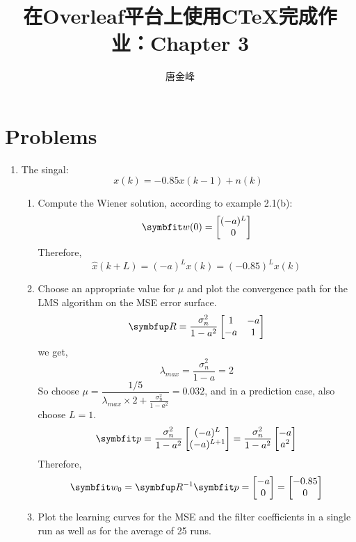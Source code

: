 \documentclass[11pt]{article}
\title{在Overleaf平台上使用C\TeX 完成作业：Chapter 3}
\author{唐金峰}
\begin{document}
\maketitle
\section*{Problems}
\begin{enumerate}[itemindent= 0pt]
    \item  The singal:
        $$x(k)=-0.85x(k-1)+n(k)$$
        \begin{enumerate}[itemindent= -5pt]
            \item Compute the Wiener solution, according to example 2.1(b):
            $$
            \Vector{w}(0)=
            \begin{bmatrix}
            (-a)^L \\ 0
            \end{bmatrix}
            $$
            Therefore,
            $$
            \hat{x}(k+L)=(-a)^{L} x(k) =(-0.85)^{L} x(k)
            $$
            \item Choose an appropriate value for $\mu$ and plot the convergence path for the LMS algorithm on the MSE error surface.
            $$
            \Matrix{R} = \frac{\sigma_n^2}{1-a^2}
            \begin{bmatrix}
            1 & -a \\
            -a & 1
            \end{bmatrix}
            $$
            we get,
            $$
            \lambda_{max} = \frac{\sigma_n^2}{1-a} = 2
            $$
            So choose $\mu= \dfrac{1/5}{\lambda_{max} \times 2 + \frac{\sigma_n^2}{1-a^2} }=0.032 $, and in a prediction case, also choose $L=1$.
            $$
            \Vector{p} = \frac{\sigma_n^2}{1-a^2}\begin{bmatrix}
            (-a)^L \\ (-a)^{L+1}
            \end{bmatrix}=\frac{\sigma_n^2}{1-a^2}\begin{bmatrix}
            -a \\ a^2
            \end{bmatrix}
            $$
            Therefore,
            $$
            \Vector{w}_0 =\Matrix{R}^{-1}\Vector{p}=\begin{bmatrix}
            -a \\ 0
            \end{bmatrix}=\begin{bmatrix}
            -0.85 \\ 0
            \end{bmatrix}
            $$
            \item Plot the learning curves for the MSE and the filter coefficients in a single run as well as for the average of 25 runs.
        \end{enumerate}
\end{enumerate}
\end{document}
